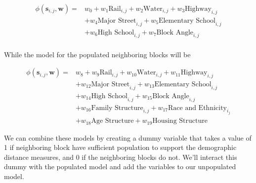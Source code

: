 \documentclass[12pt,letter]{article}\usepackage[]{graphicx}\usepackage[]{color}
\begin{document}
\begin{align}
\phi(\mathbf{s}_{i,j}, \mathbf{w}) = & w_0 
                                     + w_1\text{Rail}_{i,j} 
                                     + w_2\text{Water}_{i,j} 
                                     + w_3\text{Highway}_{i,j} \\
                                     &+ w_4\text{Major Street}_{i,j} 
                                     + w_5\text{Elementary School}_{i,j}\\ 
                                     & + w_6\text{High School}_{i,j}
                                     + w_7\text{Block Angle}_{i,j} \\
\end{align}

While the model for the populated neighboring blocks will be

\begin{align}
\phi(\mathbf{s}_{i,j}, \mathbf{w}) = & w_8 
                                     + w_9\text{Rail}_{i,j} 
                                     + w_{10}\text{Water}_{i,j} 
                                     + w_{11}\text{Highway}_{i,j}\\
                                     &+ w_{12}\text{Major Street}_{i,j} 
                                     + w_{13}\text{Elementary School}_{i,j}\\
                                     &+ w_{14}\text{High School}_{i,j} 
                                     + w_{15}\text{Block Angle}_{i,j}\\
                                     &+ w_{16}\text{Family Structure}_{i,j}
                                     + w_{17}\text{Race and Ethnicity}_{i_j}\\
                                     &+ w_{18}\text{Age Structure}  
                                     + w_{19}\text{Housing Structure}
\end{align}

We can combine these models by creating a dummy variable that takes a
value of 1 if neighboring block have sufficient population to support
the demographic distance measures, and 0 if the neighboring blocks do
not. We'll interact this dummy with the populated model and add the
variables to our unpopulated model.
\end{document}
